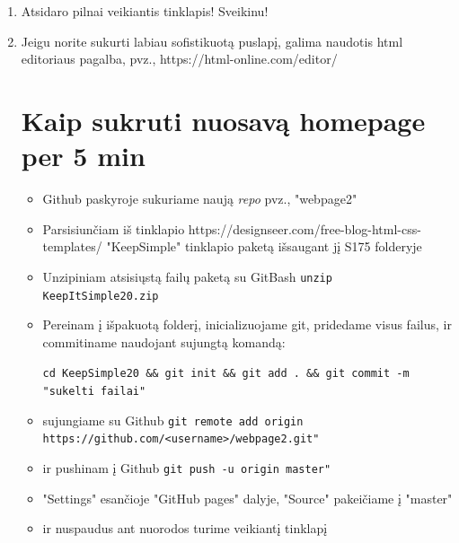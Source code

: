 \documentclass[11pt,a4paper]{article}
\begin{document}
\begin{enumerate}
\item Atsidaro pilnai veikiantis tinklapis! Sveikinu!
\begin{figure}[H]
\center
{}
\end{figure}
 
 
\item Jeigu norite sukurti labiau sofistikuotą puslapį, galima naudotis html editoriaus pagalba, pvz., https://html-online.com/editor/


\section{Kaip sukruti nuosavą homepage per 5 min}
\begin{itemize}
\item Github paskyroje sukuriame naują \textit{repo} pvz., "webpage2"
\item Parsisiunčiam iš tinklapio https://designseer.com/free-blog-html-css-templates/ "KeepSimple" tinklapio paketą išsaugant jį S175 folderyje
\item Unzipiniam atsisiųstą failų paketą su GitBash \colorbox{listinggray}{\lstinline|unzip KeepItSimple20.zip|}
\item Pereinam į išpakuotą folderį, inicializuojame git, pridedame visus failus, ir commitiname naudojant sujungtą komandą:

\colorbox{listinggray}{\lstinline|cd KeepSimple20 && git init && git add . && git commit -m "sukelti failai"|}
\item sujungiame su Github
\colorbox{listinggray}{\lstinline|git remote add origin https://github.com/<username>/webpage2.git"|}
\item ir pushinam į Github \colorbox{listinggray}{\lstinline|git push -u origin master"|}
\item "Settings" esančioje "GitHub pages" dalyje, "Source" pakeičiame į "master"
\item ir nuspaudus ant nuorodos turime veikiantį tinklapį


\end{itemize}
\end{enumerate}
\end{document}
